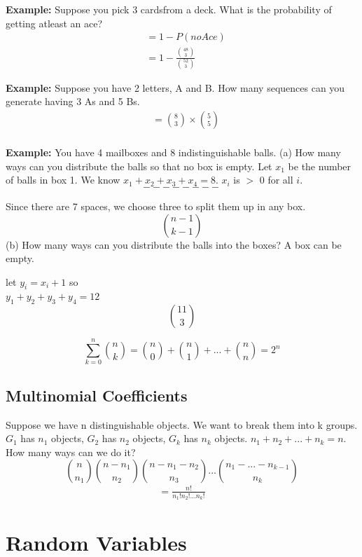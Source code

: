 \documentclass[12pt]{article}
\begin{document}
    \textbf{Example:} Suppose you pick 3 cardsfrom a deck. What is 
    the probability of getting atleast an ace?
    \begin{align*}
        &= 1 - P(noAce)\\
        &= 1 - \frac{\binom{48}{3}}{\binom{52}{3}}
    \end{align*}

    \textbf{Example:} Suppose you have 2 letters, A and B. How many
    sequences can you generate having 3 As and 5 Bs. 
    \begin{align*}
        &=\binom{8}{3} \times \binom{5}{5}\\
    \end{align*}

    \textbf{Example:} You have 4 mailboxes and 8 indistinguishable 
    balls. (a) How many ways can you distribute the balls so that no 
    box is empty. Let $x_1$ be the number of balls in box 1. We know 
    $x_1+x_2+x_3+x_4 = 8$. $x_i$ is $>$ 0 for all $i$. 
    $$- - - - - - - -$$

    Since there are 7 spaces, we choose three to split them up 
    in any box.
    $$\binom{n-1}{k-1}$$
    (b) How many ways can you distribute the balls into the boxes? 
    A box can be empty.
    \begin{center}
        let $y_i = x_i + 1$ so \\
        $y_1+y_2+y_3+y_4 = 12$\\
        $$\binom{11}{3}$$
    \end{center}

    $$\sum_{k=0}^{n}\binom{n}{k} = \binom{n}{0} + \binom{n}{1} + ...
     + \binom{n}{n} = 2^n$$

    \subsection{Multinomial Coefficients}

    Suppose we have n distinguishable objects. We want to break them 
    into k groups. $G_1$ has $n_1$ objects, $G_2$ has $n_2$ objects,
    $G_k$ has $n_k$ objects. $n_1 + n_2 + ... + n_k = n$. How many ways
    can we do it?
    $$\binom{n}{n_1}\binom{n-n_1}{n_2}\binom{n-n_1-n_2}{n_3}...
    \binom{n_1-...-n_{k-1}}{n_k}$$
    \begin{align*}
        = \frac{n!}{n_1!n_2!...n_k!}
    \end{align*}

    \section{Random Variables}
\end{document}
